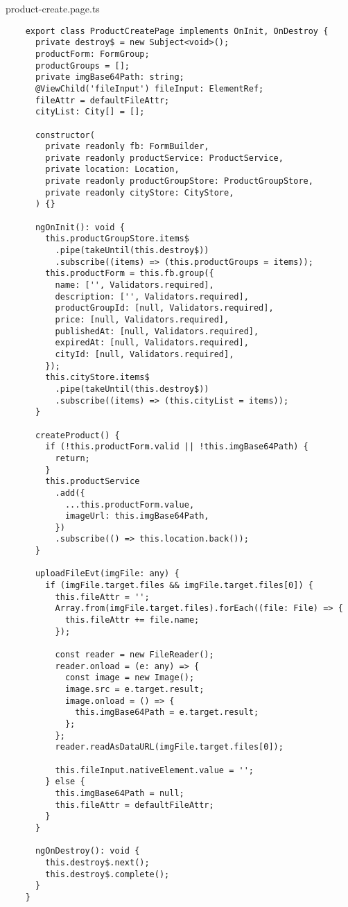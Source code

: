 product-create.page.ts
\begin{lstlisting}
    export class ProductCreatePage implements OnInit, OnDestroy {
      private destroy$ = new Subject<void>();
      productForm: FormGroup;
      productGroups = [];
      private imgBase64Path: string;
      @ViewChild('fileInput') fileInput: ElementRef;
      fileAttr = defaultFileAttr;
      cityList: City[] = [];
    
      constructor(
        private readonly fb: FormBuilder,
        private readonly productService: ProductService,
        private location: Location,
        private readonly productGroupStore: ProductGroupStore,
        private readonly cityStore: CityStore,
      ) {}
    
      ngOnInit(): void {
        this.productGroupStore.items$
          .pipe(takeUntil(this.destroy$))
          .subscribe((items) => (this.productGroups = items));
        this.productForm = this.fb.group({
          name: ['', Validators.required],
          description: ['', Validators.required],
          productGroupId: [null, Validators.required],
          price: [null, Validators.required],
          publishedAt: [null, Validators.required],
          expiredAt: [null, Validators.required],
          cityId: [null, Validators.required],
        });
        this.cityStore.items$
          .pipe(takeUntil(this.destroy$))
          .subscribe((items) => (this.cityList = items));
      }
    
      createProduct() {
        if (!this.productForm.valid || !this.imgBase64Path) {
          return;
        }
        this.productService
          .add({
            ...this.productForm.value,
            imageUrl: this.imgBase64Path,
          })
          .subscribe(() => this.location.back());
      }
    
      uploadFileEvt(imgFile: any) {
        if (imgFile.target.files && imgFile.target.files[0]) {
          this.fileAttr = '';
          Array.from(imgFile.target.files).forEach((file: File) => {
            this.fileAttr += file.name;
          });
    
          const reader = new FileReader();
          reader.onload = (e: any) => {
            const image = new Image();
            image.src = e.target.result;
            image.onload = () => {
              this.imgBase64Path = e.target.result;
            };
          };
          reader.readAsDataURL(imgFile.target.files[0]);
    
          this.fileInput.nativeElement.value = '';
        } else {
          this.imgBase64Path = null;
          this.fileAttr = defaultFileAttr;
        }
      }
    
      ngOnDestroy(): void {
        this.destroy$.next();
        this.destroy$.complete();
      }
    }    
\end{lstlisting}

